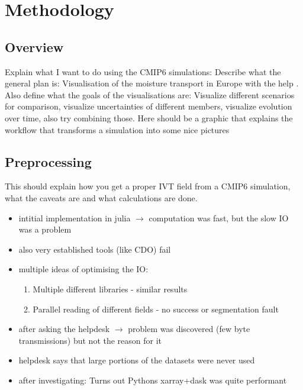 \chapter{Methodology}
\label{ch:methodology}

\section{Overview}

Explain what I want to do using the CMIP6 simulations: Describe what the general plan is: Visualisation of the moisture transport in Europe with the help . 
Also define what the goals of the visualisations are: Visualize different scenarios for comparison, visualize uncertainties of different members, visualize evolution over time, also try combining those. 
Here should be a graphic that explains the workflow that transforms a simulation into some nice pictures
\section{Preprocessing}

This should explain how you get a proper IVT field from a CMIP6 simulation, what the caveats are and what calculations are done. 

\begin{itemize}
  \item intitial implementation in julia $\rightarrow$ computation was fast, but the slow IO was a problem 
  \item also very established tools (like CDO) fail 
  \item multiple ideas of optimising the IO:
    \begin{enumerate}
      \item Multiple different libraries - similar results
      \item Parallel reading of different fields - no success or segmentation fault
    \end{enumerate}
    
  \item after asking the helpdesk $\rightarrow$ problem was discovered (few byte transmissions) but not the reason for it 
  \item helpdesk says that large portions of the datasets were never used
  \item after investigating: Turns out Pythons xarray+dask was quite performant
\end{itemize}

